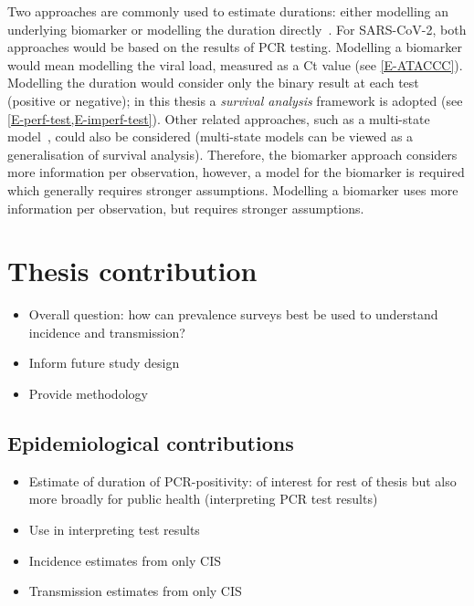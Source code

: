 \documentclass[thesis.tex]{subfiles}
\begin{document}
Two approaches are commonly used to estimate durations: either modelling an underlying biomarker or modelling the duration directly~\autocite{sweetingEstimating}.
For SARS-CoV-2, both approaches would be based on the results of PCR testing.
Modelling a biomarker would mean modelling the viral load, measured as a Ct value (see \cref{E-ATACCC}).
Modelling the duration would consider only the binary result at each test (positive or negative); in this thesis a \emph{survival analysis} framework is adopted (see \cref{E-perf-test,E-imperf-test}).
Other related approaches, such as a multi-state model~\autocite{jacksonMSM}, could also be considered (multi-state models can be viewed as a generalisation of survival analysis).
Therefore, the biomarker approach considers more information per observation, however, a model for the biomarker is required which generally requires stronger assumptions.
Modelling a biomarker uses more information per observation, but requires stronger assumptions.

\section{Thesis contribution}

\begin{itemize}
    \item Overall question: how can prevalence surveys best be used to understand incidence and transmission?
    \item Inform future study design
    \item Provide methodology
\end{itemize}

\subsection{Epidemiological contributions}

\begin{itemize}
    \item Estimate of duration of PCR-positivity: of interest for rest of thesis but also more broadly for public health (\eg interpreting PCR test results)
    \item Use in interpreting test results
    \item Incidence estimates from only CIS
    \item Transmission estimates from only CIS
\end{itemize}
\end{document}

